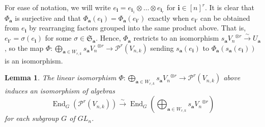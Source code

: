 \documentclass[10pt]{amsart}
\theoremstyle{definition}
\theoremstyle{definition}
\theoremstyle{plain}
\newtheorem{lemma}[lemma]{Lemma}
\theoremstyle{remark}
\theoremstyle{plain}
\theoremstyle{plain}
\newcommand{\PP}{\mathcal{P}}
\newcommand{\SG}{\mathfrak{S}}
\newcommand{\bfa}{{\boldsymbol{a}}}
\newcommand{\bfi}{{\boldsymbol{i}}}
\DeclareMathOperator{\End}{End}
\begin{document}
For ease of notation, we will write $e_\bfi=e_{\bfi_1}\otimes\dots\otimes e_{\bfi_r}$ for $\bfi\in[n]^r$. It is clear that $\Phi_\bfa$ is surjective and that $\Phi_\bfa(e_\bfi)=\Phi_\bfa(e_{\bfi'})$ exactly when $e_{\bfi'}$ can be obtained from $e_\bfi$ by rearranging factors grouped into the same product above. That is, $e_{\bfi'}=\sigma(e_\bfi)$ for some $\sigma\in\SG_\bfa$. Hence, $\Phi_\bfa$ restricts to an isomorphism $s_\bfa{V_n}^{\otimes r}\stackrel{\sim}{\longrightarrow} U_\bfa$, so the map $\Phi:\bigoplus_{\bfa\in W_{r,k}}s_\bfa {V_n}^{\otimes r}\to \PP^r(V_{n,k})$ sending $s_\bfa(e_\bfi)$ to $\Phi_\bfa(s_\bfa(e_\bfi))$ is an isomorphism.

\begin{lemma}\label{lem:induced_isomorphism}
    The linear isomorphism $\Phi: \bigoplus_{\bfa\in W_{r,k}} s_\bfa{V_n}^{\otimes r}\to\PP^r(V_{n,k})$ above induces an isomorphism of algebras \[\End_G(\PP^r(V_{n,k}))\stackrel{\sim}{\longrightarrow}\End_G\left(\bigoplus_{\bfa\in W_{r,k}}s_\bfa{V_n}^{\otimes r}\right)\] for each subgroup $G$ of $GL_n$.
\end{lemma}
\end{document}
